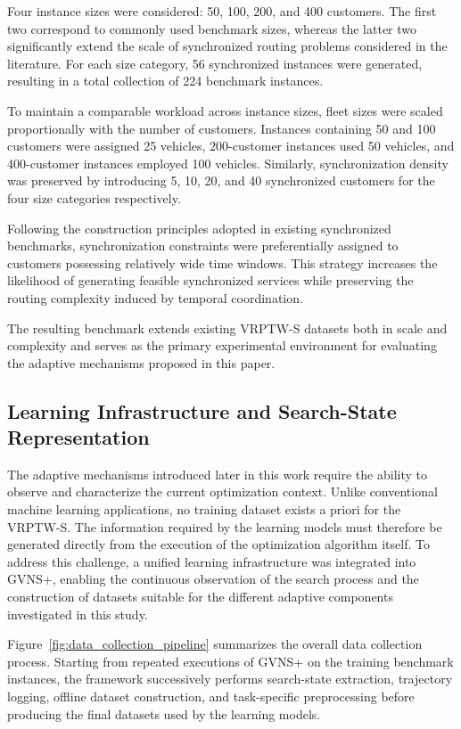 Four instance sizes were considered: 50, 100, 200, and 400 customers. The first two correspond to commonly used benchmark sizes, whereas the latter two significantly extend the scale of synchronized routing problems considered in the literature. For each size category, 56 synchronized instances were generated, resulting in a total collection of 224 benchmark instances.

To maintain a comparable workload across instance sizes, fleet sizes were scaled proportionally with the number of customers. Instances containing 50 and 100 customers were assigned 25 vehicles, 200-customer instances used 50 vehicles, and 400-customer instances employed 100 vehicles. Similarly, synchronization density was preserved by introducing 5, 10, 20, and 40 synchronized customers for the four size categories respectively.

Following the construction principles adopted in existing synchronized benchmarks, synchronization constraints were preferentially assigned to customers possessing relatively wide time windows. This strategy increases the likelihood of generating feasible synchronized services while preserving the routing complexity induced by temporal coordination.

The resulting benchmark extends existing VRPTW-S datasets both in scale and complexity and serves as the primary experimental environment for evaluating the adaptive mechanisms proposed in this paper.

\subsection{Learning Infrastructure and Search-State Representation}
The adaptive mechanisms introduced later in this work require the ability to observe and characterize the current optimization context. Unlike conventional machine learning applications, no training dataset exists a priori for the VRPTW-S. The information required by the learning models must therefore be generated directly from the execution of the optimization algorithm itself. To address this challenge, a unified learning infrastructure was integrated into GVNS+, enabling the continuous observation of the search process and the construction of datasets suitable for the different adaptive components investigated in this study.

Figure~\ref{fig:data_collection_pipeline} summarizes the overall data collection process. Starting from repeated executions of GVNS+ on the training benchmark instances, the framework successively performs search-state extraction, trajectory logging, offline dataset construction, and task-specific preprocessing before producing the final datasets used by the learning models.

